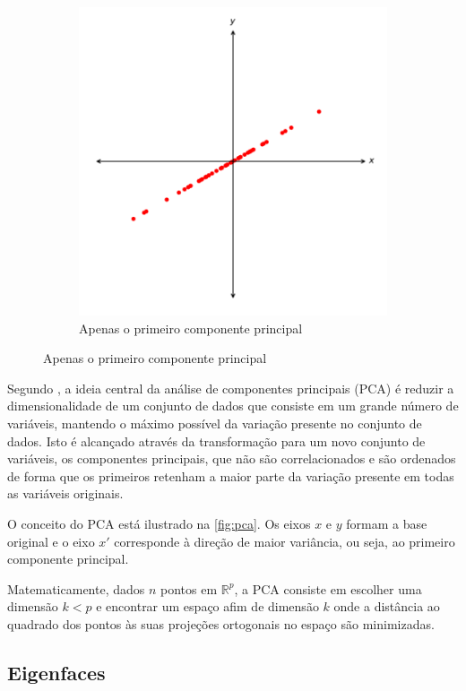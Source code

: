 \begin{figure}[htbp]
\begin{subfigure}[c]{0.45\textwidth}
    \includegraphics[width=\textwidth]{imagens/pca2.pdf}
    \caption{Apenas o primeiro componente principal}
    \end{subfigure}
\end{figure}

Segundo \cite{jolliffe2002principal}, a ideia central da análise de componentes principais (PCA) é reduzir a dimensionalidade de um conjunto de dados que consiste em um grande número de variáveis, mantendo o máximo possível da variação presente no conjunto de dados. Isto é alcançado através da transformação para um novo conjunto de variáveis, os componentes principais, que não são correlacionados e são ordenados de forma que os primeiros retenham a maior parte da variação presente em todas as variáveis originais.

O conceito do PCA está ilustrado na \autoref{fig:pca}. Os eixos $x$ e $y$ formam a base original e o eixo $x'$ corresponde à direção de maior variância, ou seja, ao primeiro componente principal.

Matematicamente, dados $n$ pontos em $\mathbb{R}^p$, a PCA consiste em escolher uma dimensão $k < p$ e encontrar um espaço afim de dimensão $k$ onde a distância ao quadrado dos pontos às suas projeções ortogonais no espaço são minimizadas.


\subsection{Eigenfaces}\label{sec:eigenfaces}

